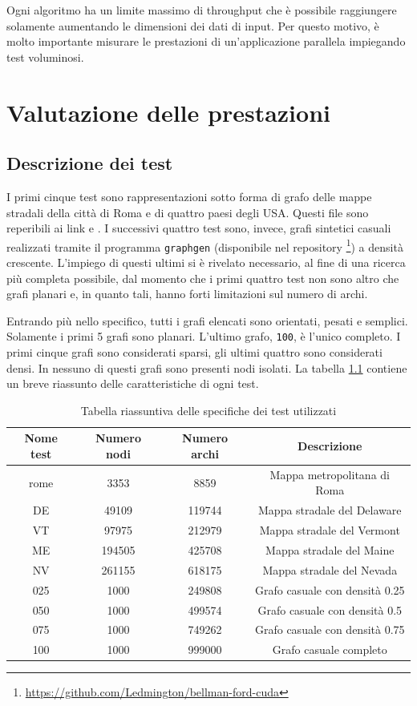 \documentclass[12pt,a4paper,oneside]{book}
\begin{document}
	Ogni algoritmo ha un limite massimo di throughput che è possibile raggiungere solamente aumentando le dimensioni dei dati di input. Per questo motivo, è molto importante misurare le prestazioni di un'applicazione parallela impiegando test voluminosi.
	
	\chapter{Valutazione delle prestazioni}
	\label{chap:perf}
	\section{Descrizione dei test}
	I primi cinque test sono rappresentazioni sotto forma di grafo delle mappe stradali della città di Roma e di quattro paesi degli USA. Questi file sono reperibili ai link \cite{testUSA} e \cite{testRoma}. I successivi quattro test sono, invece, grafi sintetici casuali realizzati tramite il programma \texttt{graphgen} (disponibile nel repository \footnote{\url{https://github.com/Ledmington/bellman-ford-cuda}}) a densità crescente. L'impiego di questi ultimi si è rivelato necessario, al fine di una ricerca più completa possibile, dal momento che i primi quattro test non sono altro che grafi planari e, in quanto tali, hanno forti limitazioni sul numero di archi.
	
	Entrando più nello specifico, tutti i grafi elencati sono orientati, pesati e semplici. Solamente i primi 5 grafi sono planari. L'ultimo grafo, \texttt{100}, è l'unico completo. I primi cinque grafi sono considerati sparsi, gli ultimi quattro sono considerati densi. In nessuno di questi grafi sono presenti nodi isolati. La tabella \ref{tab:riassunto_test} contiene un breve riassunto delle caratteristiche di ogni test.
	\begin{table}[!ht]
		\centering
		\begin{tabular}{|c|c|c|c|}
			\hline
			\textbf{Nome test} & \textbf{Numero nodi} & \textbf{Numero archi} & \textbf{Descrizione} \\ \hline
			rome & 3353 & 8859 & Mappa metropolitana di Roma \\ \hline
			DE & 49109 & 119744 & Mappa stradale del Delaware \\ \hline
			VT & 97975 & 212979 & Mappa stradale del Vermont \\ \hline
			ME & 194505 & 425708 & Mappa stradale del Maine \\ \hline
			NV & 261155 & 618175 & Mappa stradale del Nevada \\ \hline
			025 & 1000 & 249808 & Grafo casuale con densità 0.25 \\ \hline
			050 & 1000 & 499574 & Grafo casuale con densità 0.5 \\ \hline
			075 & 1000 & 749262 & Grafo casuale con densità 0.75 \\ \hline
			100 & 1000 & 999000 & Grafo casuale completo \\ \hline
		\end{tabular}
		\caption{Tabella riassuntiva delle specifiche dei test utilizzati}
		\label{tab:riassunto_test}
	\end{table}
	
\end{document}
